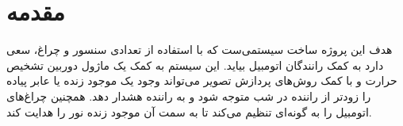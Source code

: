 \documentclass[12pt]{article}
\begin{document}
\newpage
\pagestyle{fancy}
\fancyhf{}
\fancyfoot{}
\cfoot{\thepage}
\chead{}

\newfontfamily{}

\KashidaOff
 \newcommand{\inlineLatin}[1]{
	\small{\lr{{\terminal #1}}}
}


\tableofcontents
\listoffigures
\listoftables

\newpage
\section{مقدمه}

هدف این پروژه ساخت سیستمی‌ست که با استفاده از تعدادی سنسور و چراغ، سعی دارد به کمک رانندگان اتومبیل بیاید. این سیستم به کمک یک ماژول دوربین تشخیص حرارت و با کمک روش‌های پردازش تصویر می‌تواند وجود یک موجود زنده یا عابر پیاده را زودتر از راننده در شب متوجه شود و به راننده هشدار دهد. همچنین چراغ‌های اتومبیل را به گونه‌ای تنظیم می‌کند تا به سمت آن موجود زنده نور را هدایت کند.
\end{document}
